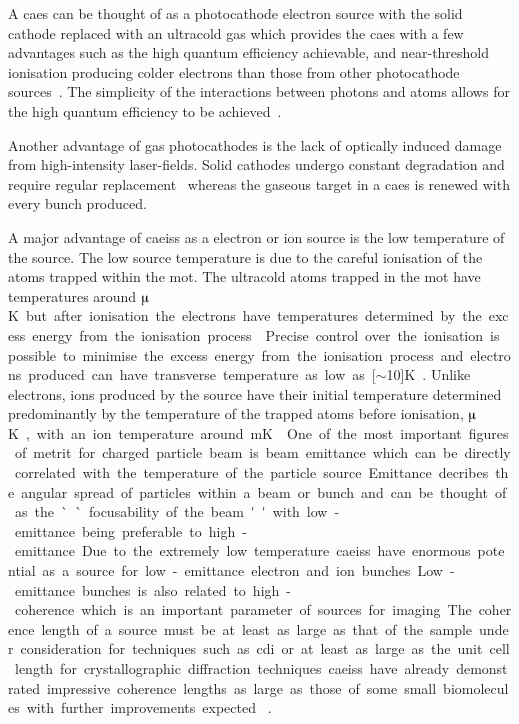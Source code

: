 A \gls{caes} can be thought of as a photocathode electron source with the solid cathode replaced with an ultracold gas which provides the \gls{caes} with a few advantages such as the high quantum efficiency achievable, and near-threshold ionisation producing colder electrons than those from other photocathode sources~\cite{engelen_effective_2014}.
The simplicity of the interactions between photons and atoms allows for the high quantum efficiency to be achieved~\cite{baranov_field_1994}.

Another advantage of gas photocathodes is the lack of optically induced damage from high-intensity laser-fields.
Solid cathodes undergo constant degradation and require regular replacement~\cite{dowell_results_1995} whereas the gaseous target in a \gls{caes} is renewed with every bunch produced.

A major advantage of \glspl{caeis} as a electron or ion source is the low temperature of the source.
The low source temperature is due to the careful ionisation of the atoms trapped within the \gls{mot}.
The ultracold atoms trapped in the \gls{mot} have temperatures around \unit[100]{$\muup$K} but after ionisation the electrons have temperatures determined by the excess energy from the ionisation process~\cite{engelen_high-coherence_2013,engelen_analytical_2014,sparkes_high-coherence_2014,speirs_identification_2017}.
Precise control over the ionisation is possible to minimise the excess energy from the ionisation process and electrons produced can have transverse temperature as low as \unit[$\sim$10]{K}~\cite{saliba_spatial_2012}.
Unlike electrons, ions produced by the source have their initial temperature determined predominantly by the temperature of the trapped atoms before ionisation, \unit[100]{$\muup$K}, with an ion temperature around \unit[1]{mK}~\cite{debernardi_measurement_2011,murphy_detailed_2014}.

One of the most important figures of metrit for charged particle beam is beam emittance which can be directly correlated with the temperature of the particle source.
Emittance decribes the angular spread of particles within a beam or bunch and can be thought of as the ``focusability of the beam'' with low-emittance being preferable to high-emittance.
Due to the extremely low temperature \glspl{caeis} have enormous potential as a source for low-emittance electron and ion bunches.
Low-emittance bunches is also related to high-coherence which is an important parameter of sources for imaging.
The coherence length of a source must be at least as large as that of the sample under consideration for techniques such as \gls{cdi} or at least as large as the unit cell length for crystallographic diffraction techniques.
\Glspl{caeis} have already demonstrated impressive coherence lengths as large as those of some small biomolecules with further improvements expected~\cite{saliba_spatial_2012} .

